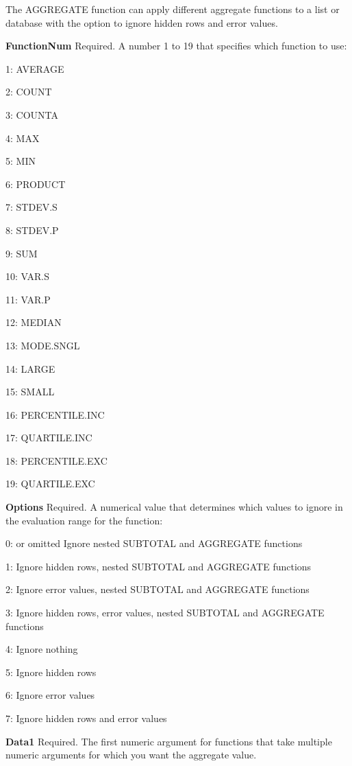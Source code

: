 \vspace{0.3cm}
The AGGREGATE function can apply different aggregate functions to a list or database with the option to ignore hidden rows and error values.

\vspace{0.3cm}
\textsf{\textbf{FunctionNum}}    Required. A number 1 to 19 that specifies which function to use:

1: AVERAGE 

2: COUNT 

3: COUNTA 

4: MAX 

5: MIN 

6: PRODUCT 

7: STDEV.S 

8: STDEV.P 

9: SUM 

10: VAR.S 

11: VAR.P 

12: MEDIAN 

13: MODE.SNGL 

14: LARGE 

15: SMALL 

16: PERCENTILE.INC  

17: QUARTILE.INC 

18: PERCENTILE.EXC 

19: QUARTILE.EXC 

\vspace{0.3cm}
\textsf{\textbf{Options}}     Required. A numerical value that determines which values to ignore in the evaluation range for the function:

0: or omitted Ignore nested SUBTOTAL and AGGREGATE functions  

1: Ignore hidden rows, nested SUBTOTAL and AGGREGATE functions  

2: Ignore error values, nested SUBTOTAL and AGGREGATE functions  

3: Ignore hidden rows, error values, nested SUBTOTAL and AGGREGATE functions 

4: Ignore nothing 

5: Ignore hidden rows 

6: Ignore error values 

7: Ignore hidden rows and error values 

\vspace{0.3cm}
\textsf{\textbf{Data1}}     Required. The first numeric argument for functions that take multiple numeric arguments for which you want the aggregate value.

